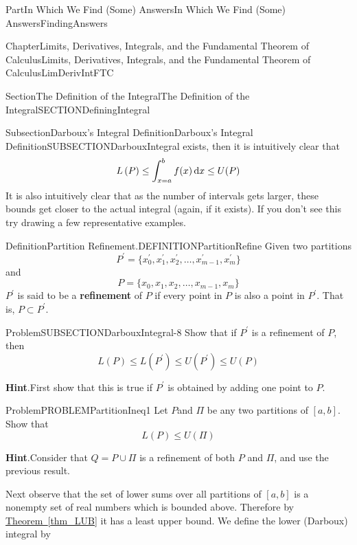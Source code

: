 \documentclass[oneside,10pt,]{book}
\newcommand{\blocktitlefont}{\relax}
\newcommand{\xreffont}{\relax}
\newcommand{\terminology}[1]{\textbf{#1}}
\numberwithin{equation}{part}
\newcommand{\dx}[1]{\,{\rm d}#1}
\begin{document}
\begin{partptx}{Part}{In Which We Find (Some) Answers}{}{In Which We Find (Some) Answers}{}{}{FindingAnswers}
\begin{chapterptx}{Chapter}{Limits, Derivatives, Integrals, and the Fundamental Theorem of Calculus}{}{Limits, Derivatives, Integrals, and the Fundamental Theorem of Calculus}{}{}{LimDerivIntFTC}
\begin{sectionptx}{Section}{The Definition of the Integral}{}{The Definition of the Integral}{}{}{SECTIONDefiningIntegral}
\begin{subsectionptx}{Subsection}{Darboux's Integral Definition}{}{Darboux's Integral Definition}{}{}{SUBSECTIONDarbouxIntegral}
exists, then it is intuitively clear that%
\begin{equation*}
L\left(P\right)\le
\int^b_{x=a}{f(x)\dx{x}}\le U(P)
\end{equation*}
It is also intuitively clear that as the number of intervals gets larger, these bounds get closer to the actual integral (again, if it exists). If you don't see this try drawing a few representative examples.%
\begin{definition}{Definition}{Partition Refinement.}{DEFINITIONPartitionRefine}%
%
%
Given two partitions%
\begin{equation*}
P^\prime=\{x^\prime_0, x^\prime_1,
x^\prime_2, \dots , x^\prime_{m-1},x^\prime_m\}
\end{equation*}
and%
\begin{equation*}
P=\{x_0, x_1, x_2, \dots , x_{m-1},x_m\}
\end{equation*}
\(P^\prime \) is said to be a \terminology{refinement} of \(P\) if every point in \(P\) is also a point in \(P^\prime\). That is, \(P\subset P^\prime \).%
\end{definition}
\begin{problem}{Problem}{}{SUBSECTIONDarbouxIntegral-8}%
Show that if \(P^\prime\) is a refinement of \(P\), then%
\begin{equation*}
L\left(P\right)\le L\left(P^\prime\right)\le
U\left(P^\prime\right)\le U(P)
\end{equation*}
%
\par\smallskip%
\noindent\textbf{\blocktitlefont Hint}.\hypertarget{SUBSECTIONDarbouxIntegral-8-2}{}\quad{}First show that this is true if \(P^\prime\) is obtained by adding one point to \(P\).%
\end{problem}
\begin{problem}{Problem}{}{PROBLEMPartitionIneq1}%
Let \(P \)and \(\Pi \) be any two partitions of \([a,b]\).  Show that%
\begin{equation*}
L\left(P\right)\le
U(\Pi{})
\end{equation*}
%
\par\smallskip%
\noindent\textbf{\blocktitlefont Hint}.\hypertarget{PROBLEMPartitionIneq1-2}{}\quad{}Consider that \(Q=P\cup \Pi \) is a refinement of both \(P\) and \(\Pi \), and use the previous result.%
\end{problem}
Next observe  that the set of lower sums over all partitions of \([a,b]\) is a non\textendash{}empty set of real numbers which is bounded above.  Therefore by \hyperref[thm_LUB]{Theorem~{\xreffont\ref{thm_LUB}}}  it has a least upper bound.  We define the lower (Darboux) integral by%

\end{subsectionptx}
\end{sectionptx}
\end{chapterptx}
\end{partptx}
\end{document}

